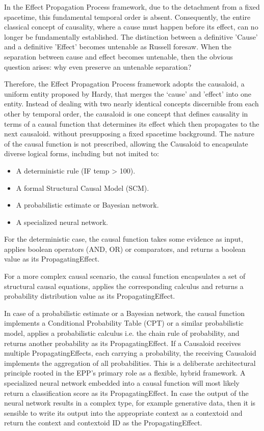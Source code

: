 In the Effect Propagation Process framework, due to the detachment from a fixed spacetime, this fundamental temporal order is absent. Consequently, the entire classical concept of causality, where a cause must happen before its effect, can no longer be fundamentally established. The distinction between a definitive 'Cause' and a definitive 'Effect' becomes untenable as Russell foresaw. When the separation between cause and effect becomes untenable, then the obvious question arises: why even preserve an untenable separation?

Therefore, the Effect Propagation Process framework adopts the causaloid, a uniform entity proposed by Hardy\cite{HardyDynamicCausalStructure}, that merges the ‘cause' and 'effect' into one entity. Instead of dealing with two nearly identical concepts discernible from each other by temporal order, the causaloid is one concept that defines causality in terms of a causal function that determines its effect which then propagates to the next causaloid. without presupposing a fixed spacetime background. The nature of the causal function is not prescribed, allowing the Causaloid to encapsulate diverse logical forms, including but not imited to:

\begin{itemize}
	\item A deterministic rule (IF temp > 100).
 	\item A formal Structural Causal Model (SCM).
	\item A probabilistic estimate or Bayesian network.
	\item A specialized neural network.
\end{itemize}

For the deterministic case, the causal function takes some evidence as input, applies boolean operators (AND, OR) or comparators, and returns a boolean value as its PropagatingEffect.

For a more complex causal scenario, the causal function encapsulates a set of structural causal equations,
applies the corresponding calculus and returns a probability distribution value as its PropagatingEffect.

In case of a probabilistic estimate or a Bayesian network, the causal function implements a Conditional Probability Table (CPT) or a similar probabilistic model, applies a probabilistic calculus i.e. the chain rule of probability, and returns another probability as its PropagatingEffect. If a Causaloid receives multiple PropagatingEffects, each carrying a probability, the receiving Causaloid implements the aggregation of all probabilities. This is a deliberate architectural principle rooted in the EPP's primary role as a flexible, hybrid framework. A specialized neural network embedded into a causal function will most likely return a classification score as its PropagatingEffect. In case the output of the neural network results in a complex type, for example 
generative data, then it is sensible to write its output into the appropriate context as a contextoid and return the context and contextoid ID as the PropagatingEffect. 


